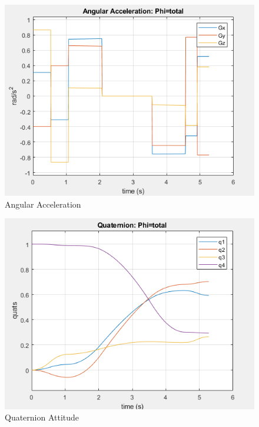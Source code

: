 \documentclass[letterpaper, preprint, paper,11pt]{AAS}	%
\begin{document}
		
			\begin{figure}[H]
				\label{fig:ang_accel_total}
				\begin{center}
					\includegraphics[width=4.5in]{figures/alphaNot0/ang_accel_total.png}
				\end{center}
				\caption{Angular Acceleration}
			\end{figure}
		
			\begin{figure}[H]
				\label{fig:quats_phi_total}
				\begin{center}
				\includegraphics[width=4.5in]{figures/alphaNot0/quats_phi_total.png}
				\end{center}
				\caption{Quaternion Attitude}
			\end{figure}
		
\end{document}
